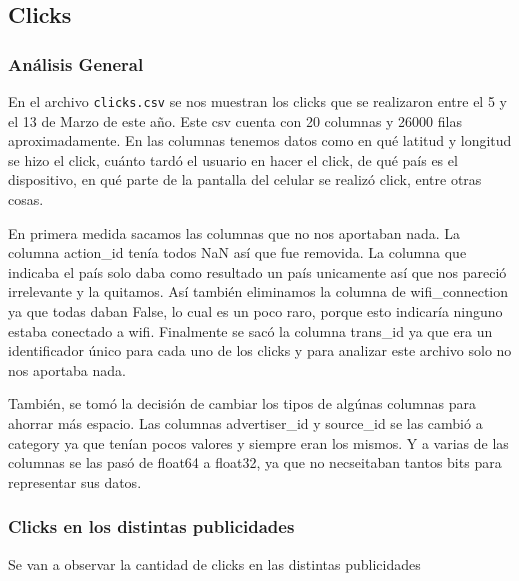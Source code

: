\documentclass[a4paper, 12pt]{article}
\begin{document}
\clearpage
\subsection{Clicks}
	\subsubsection{Análisis General}
		
		 En el archivo \texttt{clicks.csv} se nos muestran los clicks que se realizaron entre el 5 y el 13 de Marzo de este año. Este csv cuenta con 20 columnas y 26000 filas aproximadamente. En las columnas tenemos datos como en qué latitud y longitud se hizo el click, cuánto tardó el usuario en hacer el click, de qué país es el dispositivo, en qué parte de la pantalla del celular se realizó click, entre otras cosas.
		
		 En primera medida sacamos las columnas que no nos aportaban nada. La columna action\_id tenía todos NaN así que fue removida. La columna que indicaba el país solo daba como resultado un país unicamente así que nos pareció irrelevante y la quitamos. Así también eliminamos la columna de wifi\_connection ya que todas daban False, lo cual es un poco raro, porque esto indicaría ninguno estaba conectado a wifi. Finalmente se sacó la columna trans\_id ya que era un identificador único para cada uno de los clicks y para analizar este archivo solo no nos aportaba nada.
		
		 También, se tomó la decisión de cambiar los tipos de algúnas columnas para ahorrar más espacio. Las columnas advertiser\_id y source\_id se las cambió a category ya que tenían pocos valores y siempre eran los mismos. Y a varias de las columnas se las pasó de float64 a float32, ya que no necseitaban tantos bits para representar sus datos.
	\subsubsection{Clicks en los distintas publicidades}
		 Se van a observar la cantidad de clicks en las distintas publicidades
\end{document}
